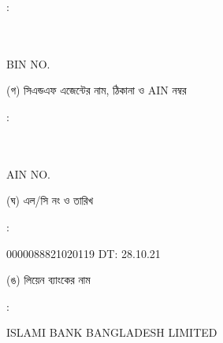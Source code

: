 \documentclass[12pt]{article}
\newcommand{\lcno}{0000088821020119}
\newcommand{\lcdt}{28.10.21}
\newcommand{\lienbank}{ISLAMI BANK BANGLADESH LIMITED}
\newcommand{\impn}{\jeal}
\newcommand{\impadd}{\jeala}
\newcommand{\impbin}{\jealbin}
\begin{document}
\begin{minipage}[t]{0.02\linewidth}
:
\end{minipage}
\begin{minipage}[t]{0.53\linewidth}
\textbf{{\impn}}
\\
{\impadd}
\\
BIN NO. {\impbin}
\\
\end{minipage}
\begin{minipage}[t]{0.05\linewidth}
\hspace*{1em}
\end{minipage}
\begin{minipage}[t]{0.40\linewidth}
(গ) সিএন্ডএফ এজেন্টের নাম, ঠিকানা
ও AIN নম্বর
\end{minipage}
\begin{minipage}[t]{0.02\linewidth}
:
\end{minipage}
\begin{minipage}[t]{0.53\linewidth}
\textbf{{\cnfn}}
\\
{\cnfadd}
\\
AIN NO. {\cnfain}
\\
\end{minipage}
\begin{minipage}[t]{0.05\linewidth}
\hspace*{1em}
\end{minipage}
\begin{minipage}[t]{0.40\linewidth}
(ঘ) এল/সি নং ও তারিখ
\end{minipage}
\begin{minipage}[t]{0.02\linewidth}
:
\end{minipage}
\begin{minipage}[t]{0.53\linewidth}
{\lcno} \hspace{2em} DT: {\lcdt}
\\
\end{minipage}
\begin{minipage}[t]{0.05\linewidth}
\hspace*{1em}
\end{minipage}
\begin{minipage}[t]{0.40\linewidth}
(ঙ) লিয়েন ব্যাংকের নাম
\end{minipage}
\begin{minipage}[t]{0.02\linewidth}
:
\end{minipage}
\begin{minipage}[t]{0.53\linewidth}
{\lienbank}
\\
\end{minipage}
\end{document}
